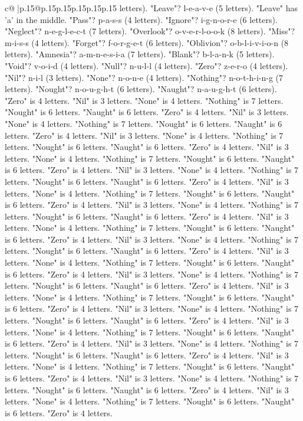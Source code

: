 \documentclass{article}
\begin{document}
{\begin{supertabular}{c@{$\;$}|p{.15\linewidth}@{}p{.15\linewidth}p{.15\linewidth}p{.15\linewidth}p{.15\linewidth}p{.15\linewidth}}
{{{letters). "Leave"? l{-}e{-}a{-}v{-}e (5 letters). "Leave" has 'a' in the middle. "Pass"? p{-}a{-}s{-}s (4 letters). "Ignore"? i{-}g{-}n{-}o{-}r{-}e (6 letters). "Neglect"? n{-}e{-}g{-}l{-}e{-}c{-}t (7 letters). "Overlook"? o{-}v{-}e{-}r{-}l{-}o{-}o{-}k (8 letters). "Miss"? m{-}i{-}s{-}s (4 letters). "Forget"? f{-}o{-}r{-}g{-}e{-}t (6 letters). "Oblivion"? o{-}b{-}l{-}i{-}v{-}i{-}o{-}n (8 letters). "Amnesia"? a{-}m{-}n{-}e{-}s{-}i{-}a (7 letters). "Blank"? b{-}l{-}a{-}n{-}k (5 letters). "Void"? v{-}o{-}i{-}d (4 letters). "Null"? n{-}u{-}l{-}l (4 letters). "Zero"? z{-}e{-}r{-}o (4 letters). "Nil"? n{-}i{-}l (3 letters). "None"? n{-}o{-}n{-}e (4 letters). "Nothing"? n{-}o{-}t{-}h{-}i{-}n{-}g (7 letters). "Nought"? n{-}o{-}u{-}g{-}h{-}t (6 letters). "Naught"? n{-}a{-}u{-}g{-}h{-}t (6 letters). "Zero" is 4 letters. "Nil" is 3 letters. "None" is 4 letters. "Nothing" is 7 letters. "Nought" is 6 letters. "Naught" is 6 letters. "Zero" is 4 letters. "Nil" is 3 letters. "None" is 4 letters. "Nothing" is 7 letters. "Nought" is 6 letters. "Naught" is 6 letters. "Zero" is 4 letters. "Nil" is 3 letters. "None" is 4 letters. "Nothing" is 7 letters. "Nought" is 6 letters. "Naught" is 6 letters. "Zero" is 4 letters. "Nil" is 3 letters. "None" is 4 letters. "Nothing" is 7 letters. "Nought" is 6 letters. "Naught" is 6 letters. "Zero" is 4 letters. "Nil" is 3 letters. "None" is 4 letters. "Nothing" is 7 letters. "Nought" is 6 letters. "Naught" is 6 letters. "Zero" is 4 letters. "Nil" is 3 letters. "None" is 4 letters. "Nothing" is 7 letters. "Nought" is 6 letters. "Naught" is 6 letters. "Zero" is 4 letters. "Nil" is 3 letters. "None" is 4 letters. "Nothing" is 7 letters. "Nought" is 6 letters. "Naught" is 6 letters. "Zero" is 4 letters. "Nil" is 3 letters. "None" is 4 letters. "Nothing" is 7 letters. "Nought" is 6 letters. "Naught" is 6 letters. "Zero" is 4 letters. "Nil" is 3 letters. "None" is 4 letters. "Nothing" is 7 letters. "Nought" is 6 letters. "Naught" is 6 letters. "Zero" is 4 letters. "Nil" is 3 letters. "None" is 4 letters. "Nothing" is 7 letters. "Nought" is 6 letters. "Naught" is 6 letters. "Zero" is 4 letters. "Nil" is 3 letters. "None" is 4 letters. "Nothing" is 7 letters. "Nought" is 6 letters. "Naught" is 6 letters. "Zero" is 4 letters. "Nil" is 3 letters. "None" is 4 letters. "Nothing" is 7 letters. "Nought" is 6 letters. "Naught" is 6 letters. "Zero" is 4 letters. "Nil" is 3 letters. "None" is 4 letters. "Nothing" is 7 letters. "Nought" is 6 letters. "Naught" is 6 letters. "Zero" is 4 letters. "Nil" is 3 letters. "None" is 4 letters. "Nothing" is 7 letters. "Nought" is 6 letters. "Naught" is 6 letters. "Zero" is 4 letters. "Nil" is 3 letters. "None" is 4 letters. "Nothing" is 7 letters. "Nought" is 6 letters. "Naught" is 6 letters. "Zero" is 4 letters. "Nil" is 3 letters. "None" is 4 letters. "Nothing" is 7 letters. "Nought" is 6 letters. "Naught" is 6 letters. "Zero" is 4 letters. "Nil" is 3 letters. "None" is 4 letters. "Nothing" is 7 letters. "Nought" is 6 letters. "Naught" is 6 letters. "Zero" is 4 letters. "Nil" is 3 letters. "None" is 4 letters. "Nothing" is 7 letters. "Nought" is 6 letters. "Naught" is 6 letters. "Zero" is 4 letters. }}}
\end{supertabular}}
\end{document}
